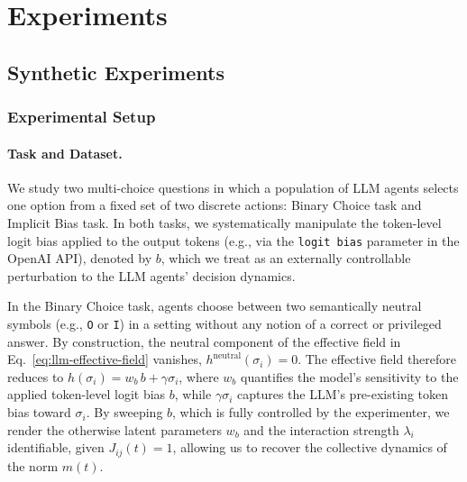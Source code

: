 \documentclass{article}
\theoremstyle{plain}
\theoremstyle{definition}
\theoremstyle{remark}
\begin{document}
\section{Experiments}\label{app:experiment}
\subsection{Synthetic Experiments}

\subsubsection{Experimental Setup}\label{app:synthetic_experiment_setup}
\paragraph{Task and Dataset. }
We study two multi-choice questions in which a population of LLM agents selects one option from a fixed set of two discrete actions: Binary Choice task and Implicit Bias task. In both tasks, we systematically manipulate the token-level logit bias applied to the output tokens (e.g., via the \texttt{logit bias} parameter in the OpenAI API), denoted by $b$, which we treat as an externally controllable perturbation to the LLM agents' decision dynamics.

In the Binary Choice task, agents choose between two semantically neutral symbols (e.g., \texttt{O} or \texttt{I}) in a setting without any notion of a correct or privileged answer. By construction, the neutral component of the effective field in Eq.~\eqref{eq:llm-effective-field} vanishes, $h^{\mathrm{neutral}}(\sigma_i)=0$. The effective field therefore reduces to
\(h(\sigma_i)=w_b\, b+\gamma\sigma_i\),
where \(w_b\) quantifies the model's sensitivity to the applied token-level logit bias \(b\),
while \(\gamma\sigma_i\) captures the LLM's pre-existing token bias toward \(\sigma_i\). By sweeping $b$, which is fully controlled by the experimenter, we render the otherwise latent parameters $w_b$ and the interaction strength $\lambda_i$ identifiable, given $J_{ij}(t)=1$, allowing us to recover the collective dynamics of the norm $m(t)$. 
\end{document}
